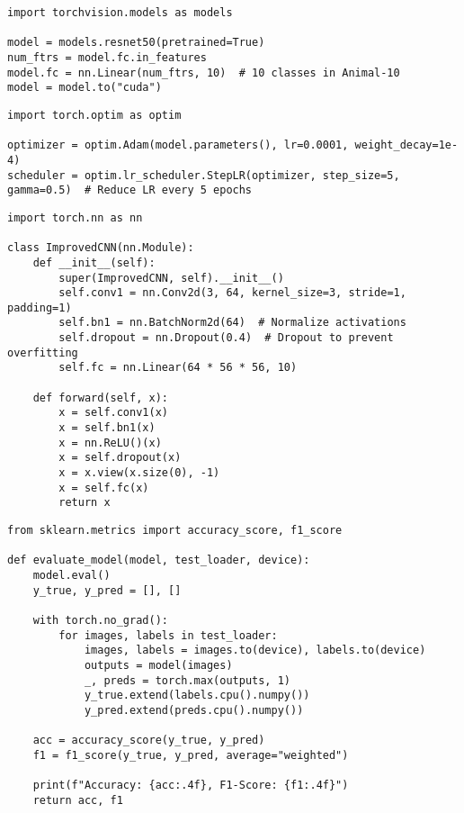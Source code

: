 \documentclass{article}
\begin{document}
\begin{verbatim}
import torchvision.models as models

model = models.resnet50(pretrained=True)
num_ftrs = model.fc.in_features
model.fc = nn.Linear(num_ftrs, 10)  # 10 classes in Animal-10
model = model.to("cuda")

\end{verbatim}

\begin{verbatim}
import torch.optim as optim

optimizer = optim.Adam(model.parameters(), lr=0.0001, weight_decay=1e-4)
scheduler = optim.lr_scheduler.StepLR(optimizer, step_size=5, gamma=0.5)  # Reduce LR every 5 epochs

\end{verbatim}

\begin{verbatim}
import torch.nn as nn

class ImprovedCNN(nn.Module):
    def __init__(self):
        super(ImprovedCNN, self).__init__()
        self.conv1 = nn.Conv2d(3, 64, kernel_size=3, stride=1, padding=1)
        self.bn1 = nn.BatchNorm2d(64)  # Normalize activations
        self.dropout = nn.Dropout(0.4)  # Dropout to prevent overfitting
        self.fc = nn.Linear(64 * 56 * 56, 10)

    def forward(self, x):
        x = self.conv1(x)
        x = self.bn1(x)
        x = nn.ReLU()(x)
        x = self.dropout(x)
        x = x.view(x.size(0), -1)
        x = self.fc(x)
        return x

\end{verbatim}

\begin{verbatim}
from sklearn.metrics import accuracy_score, f1_score

def evaluate_model(model, test_loader, device):
    model.eval()
    y_true, y_pred = [], []

    with torch.no_grad():
        for images, labels in test_loader:
            images, labels = images.to(device), labels.to(device)
            outputs = model(images)
            _, preds = torch.max(outputs, 1)
            y_true.extend(labels.cpu().numpy())
            y_pred.extend(preds.cpu().numpy())

    acc = accuracy_score(y_true, y_pred)
    f1 = f1_score(y_true, y_pred, average="weighted")

    print(f"Accuracy: {acc:.4f}, F1-Score: {f1:.4f}")
    return acc, f1

\end{verbatim}
\end{document}
